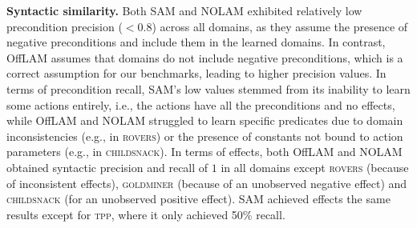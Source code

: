 \documentclass{article}
\newcommand{\miniparagraph}[1]{\textbf{#1.}}
\theoremstyle{definition}
\theoremstyle{remark}
\newcommand{\nolam}{NOLAM\xspace}
\newcommand{\offlam}{OffLAM\xspace}
\newcommand{\samshort}{SAM}
\newif\ifaddcomments
\newcommand{\roni}[1]{\ifaddcomments{\textcolor{red}{[Roni: #1]}}\fi}
\newcommand{\leo}[1]{\ifaddcomments{\textcolor{pink}{[Leonardo: #1]}}\fi}
\begin{document}
\miniparagraph{Syntactic similarity} 
Both \samshort{} and \nolam{} exhibited relatively low precondition precision ($<0.8$) across all domains, as they assume the presence of negative preconditions and include them in the learned domains. 
In contrast, \offlam{} assumes that domains do not include negative preconditions, which is a correct assumption for our benchmarks, leading to higher precision values.
In terms of precondition recall, \samshort{}'s low values stemmed from its inability to learn some actions entirely, i.e., the actions have all the preconditions and no effects, while \offlam{} and \nolam{} struggled to learn specific predicates due to domain inconsistencies (e.g., in \textsc{rovers}) or the presence of constants not bound to action parameters (e.g., in \textsc{childsnack}).
In terms of effects, both \offlam{} and \nolam obtained syntactic precision and recall of $1$ in all domains except \textsc{rovers} (because of inconsistent effects), \textsc{goldminer} (because of an unobserved negative effect) and \textsc{childsnack} (for an unobserved positive effect). \samshort{} achieved effects the same results except for \textsc{tpp}, where it only achieved 50\% recall.
\end{document}
